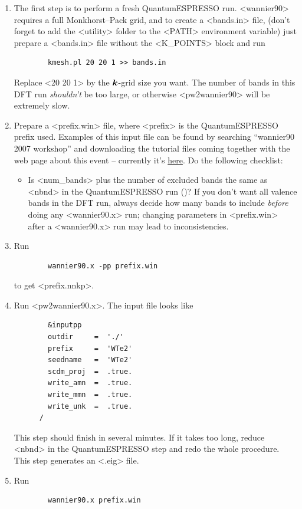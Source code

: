 \documentclass[hyperref, a4paper, 12pt]{report}
\def\texttt#1{<#1>}%
\newcommand{\shortcode}[1]{\texttt{#1}}
\begin{document}
\begin{enumerate}
    \item The first step is to perform a fresh QuantumESPRESSO run.
    \shortcode{wannier90} requires a full Monkhorst–Pack grid,
    and to create a \shortcode{bands.in} file, 
    (don't forget to add the \shortcode{utility} folder to the \shortcode{PATH} environment variable)
    just prepare a \shortcode{bands.in} file without the \shortcode{K_POINTS} block and run 
    \begin{lstlisting}
        kmesh.pl 20 20 1 >> bands.in
    \end{lstlisting}
    Replace \shortcode{20 20 1} by the $\vb*{k}$-grid size you want. 
    The number of bands in this DFT run \emph{shouldn't} be too large,
    or otherwise \shortcode{pw2wannier90} will be extremely slow. 
    \item Prepare a \shortcode{prefix.win} file, 
    where \shortcode{prefix} is the QuantumESPRESSO prefix used.
    Examples of this input file can be found by searching 
    ``wannier90 2007 workshop''
    and downloading the tutorial files coming together
    with the web page about this event -- 
    currently it's \href{http://www.wannier.org/events/cecampsi-k-tutorial-on-wannier90-lyon-2007/}{here}.
    Do the following checklist:
    \begin{itemize}
        \item Is \shortcode{num_bands} plus the number of excluded bands 
        the same as \shortcode{nbnd} in the QuantumESPRESSO run
        ()?
        If you don't want all valence bands in the DFT run, 
        always decide how many bands to include \emph{before} doing any \shortcode{wannier90.x} run;
        changing parameters in \shortcode{prefix.win}
        after a \shortcode{wannier90.x} run may lead to inconsistencies.
    \end{itemize}
    \item Run
    \begin{lstlisting}
        wannier90.x -pp prefix.win
    \end{lstlisting}
    to get \shortcode{prefix.nnkp}.
    \item Run \shortcode{pw2wannier90.x}.
    The input file looks like 
    \begin{lstlisting}
        &inputpp
        outdir     =  './'
        prefix     =  'WTe2'
        seedname   =  'WTe2'
        scdm_proj  =  .true.
        write_amn  =  .true.                                                        
        write_mmn  =  .true.
        write_unk  =  .true.
      /
    \end{lstlisting}
    This step should finish in several minutes.
    If it takes too long, 
    reduce \shortcode{nbnd} in the QuantumESPRESSO step 
    and redo the whole procedure.
    This step generates an \shortcode{.eig} file.
    \item Run 
    \begin{lstlisting}
        wannier90.x prefix.win
    \end{lstlisting}
\end{enumerate}
\end{document}
